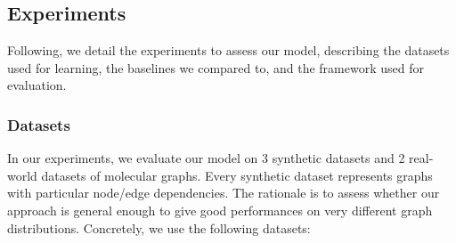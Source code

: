 \subsection{Experiments}
Following, we detail the experiments to assess our model, describing the datasets used for learning, the baselines we compared to, and the framework used for evaluation.

\subsubsection*{Datasets}\label{sec:datasets}
In our experiments, we evaluate our model on 3 synthetic datasets and 2 real-world datasets of molecular graphs. Every synthetic dataset represents graphs with particular node/edge dependencies. The rationale is to assess whether our approach is general enough to give good performances on very different graph distributions. Concretely, we use the following datasets:

